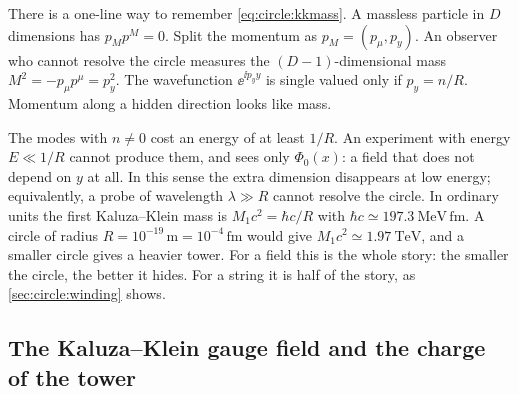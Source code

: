 There is a one-line way to remember \eqref{eq:circle:kkmass}. A massless particle in $D$
dimensions has $p_Mp^M=0$. Split the momentum as $p_M=(p_\mu,p_y)$. An observer who cannot
resolve the circle measures the $(D-1)$-dimensional mass $M^2=-p_\mu p^\mu=p_y^2$. The
wavefunction $\ee^{\ii p_yy}$ is single valued only if $p_y=n/R$. Momentum along a hidden
direction looks like mass.

\begin{physicsbox}
The modes with $n\neq0$ cost an energy of at least $1/R$. An experiment with energy
$E\ll1/R$ cannot produce them, and sees only $\Phi_0(x)$: a field that does not depend on
$y$ at all. In this sense the extra dimension disappears at low energy; equivalently, a
probe of wavelength $\lambda\gg R$ cannot resolve the circle. In ordinary units the first
Kaluza--Klein mass is $M_1c^2=\hbar c/R$ with $\hbar c\simeq197.3\ \mathrm{MeV\,fm}$. A circle
of radius $R=10^{-19}\,\mathrm{m}=10^{-4}\,\mathrm{fm}$ would give
$M_1c^2\simeq1.97\ \mathrm{TeV}$, and a smaller circle gives a heavier tower. For a field this
is the whole story: the smaller the circle, the better it hides. For a string it is half of
the story, as \cref{sec:circle:winding} shows.
\end{physicsbox}

\subsection{The Kaluza--Klein gauge field and the charge of the tower}\label{sec:circle:kkgauge}

